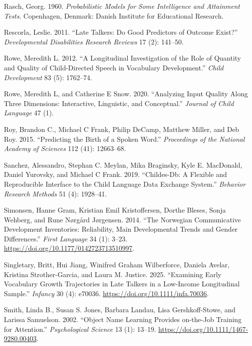 \documentclass[
  11pt,
]{article}
\newlength{\cslhangindent}
\newenvironment{CSLReferences}[2] %
 {\begin{list}{}{%
  \setlength{\itemindent}{0pt}
  \setlength{\leftmargin}{0pt}
  \setlength{\parsep}{0pt}
  \ifodd #1
   \setlength{\leftmargin}{\cslhangindent}
   \setlength{\itemindent}{-1\cslhangindent}
  \fi
  \setlength{\itemsep}{#2\baselineskip}}}
 {\end{list}}
\begin{document}
\begin{CSLReferences}{1}{0}
Rasch, Georg. 1960. \emph{Probabilistic Models for Some Intelligence and
Attainment Tests}. Copenhagen, Denmark: Danish Institute for Educational
Research.

Rescorla, Leslie. 2011. {``Late Talkers: Do Good Predictors of Outcome
Exist?''} \emph{Developmental Disabilities Research Reviews} 17 (2):
141--50.

Rowe, Meredith L. 2012. {``A Longitudinal Investigation of the Role of
Quantity and Quality of Child-Directed Speech in Vocabulary
Development.''} \emph{Child Development} 83 (5): 1762--74.

Rowe, Meredith L, and Catherine E Snow. 2020. {``Analyzing Input Quality
Along Three Dimensions: Interactive, Linguistic, and Conceptual.''}
\emph{Journal of Child Language} 47 (1).

Roy, Brandon C., Michael C Frank, Philip DeCamp, Matthew Miller, and Deb
Roy. 2015. {``Predicting the Birth of a Spoken Word.''}
\emph{Proceedings of the National Academy of Sciences} 112 (41):
12663--68.

Sanchez, Alessandro, Stephan C. Meylan, Mika Braginsky, Kyle E.
MacDonald, Daniel Yurovsky, and Michael C Frank. 2019. {``Childes-Db: A
Flexible and Reproducible Interface to the Child Language Data Exchange
System.''} \emph{Behavior Research Methods} 51 (4): 1928--41.

Simonsen, Hanne Gram, Kristian Emil Kristoffersen, Dorthe Bleses, Sonja
Wehberg, and Rune Nørgård Jørgensen. 2014. {``The {Norwegian}
{Communicative} {Development} {Inventories}: Reliability, Main
Developmental Trends and Gender Differences.''} \emph{First Language} 34
(1): 3--23. \url{https://doi.org/10.1177/0142723713510997}.

Singletary, Britt, Hui Jiang, Winifred Graham Wilberforce, Daniela
Avelar, Kristina Strother-Garcia, and Laura M. Justice. 2025.
{``Examining Early Vocabulary Growth Trajectories in Late Talkers in a
Low-Income Longitudinal Sample.''} \emph{Infancy} 30 (4): e70036.
\url{https://doi.org/10.1111/infa.70036}.

Smith, Linda B., Susan S. Jones, Barbara Landau, Lisa Gershkoff-Stowe,
and Larissa Samuelson. 2002. {``Object Name Learning Provides on-the-Job
Training for Attention.''} \emph{Psychological Science} 13 (1): 13--19.
\url{https://doi.org/10.1111/1467-9280.00403}.


\end{CSLReferences}
\end{document}
